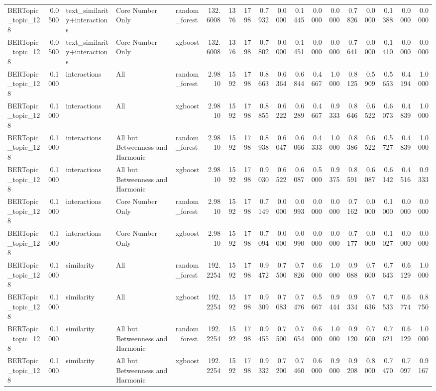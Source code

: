\begin{tabular}{lrlllrrrrrrrrrrrrr}
BERTopic_topic_128 & 0.0500 & text_similarity+interactions & Core Number Only & random_forest & 132.6008 & 1376 & 1798 & 0.7932 & 0.0000 & 0.1445 & 0.0000 & 0.0000 & 0.7826 & 0.0000 & 0.1388 & 0.0000 & 0.0000 \\
BERTopic_topic_128 & 0.0500 & text_similarity+interactions & Core Number Only & xgboost & 132.6008 & 1376 & 1798 & 0.7802 & 0.0000 & 0.1451 & 0.0000 & 0.0000 & 0.7641 & 0.0000 & 0.1410 & 0.0000 & 0.0000 \\
BERTopic_topic_128 & 0.1000 & interactions & All & random_forest & 2.9810 & 1592 & 1798 & 0.8663 & 0.6364 & 0.6844 & 0.4667 & 1.0000 & 0.8125 & 0.5909 & 0.5653 & 0.4194 & 1.0000 \\
BERTopic_topic_128 & 0.1000 & interactions & All & xgboost & 2.9810 & 1592 & 1798 & 0.8855 & 0.6222 & 0.6289 & 0.4667 & 0.9333 & 0.8646 & 0.6522 & 0.6073 & 0.4839 & 1.0000 \\
BERTopic_topic_128 & 0.1000 & interactions & All but Betweenness and Harmonic & random_forest & 2.9810 & 1592 & 1798 & 0.8938 & 0.6047 & 0.6066 & 0.4333 & 1.0000 & 0.8386 & 0.6522 & 0.5727 & 0.4839 & 1.0000 \\
BERTopic_topic_128 & 0.1000 & interactions & All but Betweenness and Harmonic & xgboost & 2.9810 & 1592 & 1798 & 0.9030 & 0.6522 & 0.6087 & 0.5000 & 0.9375 & 0.8591 & 0.6087 & 0.6142 & 0.4516 & 0.9333 \\
BERTopic_topic_128 & 0.1000 & interactions & Core Number Only & random_forest & 2.9810 & 1592 & 1798 & 0.7149 & 0.0000 & 0.0993 & 0.0000 & 0.0000 & 0.7162 & 0.0000 & 0.1000 & 0.0000 & 0.0000 \\
BERTopic_topic_128 & 0.1000 & interactions & Core Number Only & xgboost & 2.9810 & 1592 & 1798 & 0.7094 & 0.0000 & 0.0990 & 0.0000 & 0.0000 & 0.7177 & 0.0000 & 0.1027 & 0.0000 & 0.0000 \\
BERTopic_topic_128 & 0.1000 & similarity & All & random_forest & 192.2254 & 1592 & 1798 & 0.9472 & 0.7500 & 0.7826 & 0.6000 & 1.0000 & 0.9088 & 0.7600 & 0.7643 & 0.6129 & 1.0000 \\
BERTopic_topic_128 & 0.1000 & similarity & All & xgboost & 192.2254 & 1592 & 1798 & 0.9309 & 0.7083 & 0.7476 & 0.5667 & 0.9444 & 0.9334 & 0.7636 & 0.7533 & 0.6774 & 0.8750 \\
BERTopic_topic_128 & 0.1000 & similarity & All but Betweenness and Harmonic & random_forest & 192.2254 & 1592 & 1798 & 0.9455 & 0.7500 & 0.7654 & 0.6000 & 1.0000 & 0.9120 & 0.7600 & 0.7621 & 0.6129 & 1.0000 \\
BERTopic_topic_128 & 0.1000 & similarity & All but Betweenness and Harmonic & xgboost & 192.2254 & 1592 & 1798 & 0.9332 & 0.7200 & 0.7460 & 0.6000 & 0.9000 & 0.9208 & 0.8000 & 0.7470 & 0.7097 & 0.9167 \\

\end{tabular}
